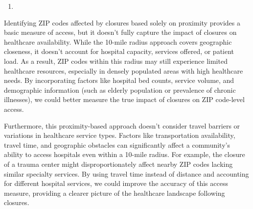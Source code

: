 \documentclass[
  letterpaper,
  DIV=11,
  numbers=noendperiod]{scrartcl}
\providecommand{\tightlist}{%
  \setlength{\itemsep}{0pt}\setlength{\parskip}{0pt}}\usepackage{longtable,booktabs,array}
\begin{document}
\begin{enumerate}
\def\labelenumi{\arabic{enumi}.}
\setcounter{enumi}{1}
\tightlist
\item
\end{enumerate}

Identifying ZIP codes affected by closures based solely on proximity
provides a basic measure of access, but it doesn't fully capture the
impact of closures on healthcare availability. While the 10-mile radius
approach covers geographic closeness, it doesn't account for hospital
capacity, services offered, or patient load. As a result, ZIP codes
within this radius may still experience limited healthcare resources,
especially in densely populated areas with high healthcare needs. By
incorporating factors like hospital bed counts, service volume, and
demographic information (such as elderly population or prevalence of
chronic illnesses), we could better measure the true impact of closures
on ZIP code-level access.

Furthermore, this proximity-based approach doesn't consider travel
barriers or variations in healthcare service types. Factors like
transportation availability, travel time, and geographic obstacles can
significantly affect a community's ability to access hospitals even
within a 10-mile radius. For example, the closure of a trauma center
might disproportionately affect nearby ZIP codes lacking similar
specialty services. By using travel time instead of distance and
accounting for different hospital services, we could improve the
accuracy of this access measure, providing a clearer picture of the
healthcare landscape following closures.
\end{document}

